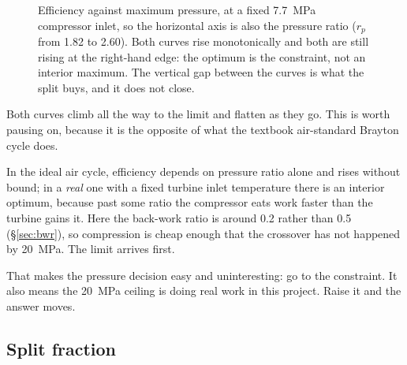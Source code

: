 \documentclass[11pt,a4paper]{report}
\begin{document}
\begin{figure}[htbp]
\centering
{}
\caption{Efficiency against maximum pressure, at a fixed
\SI{7.7}{\mega\pascal} compressor inlet, so the horizontal axis is also the
pressure ratio ($r_p$ from \num{1.82} to \num{2.60}). Both curves rise
monotonically and both are still rising at the right-hand edge: the optimum
is the constraint, not an interior maximum. The vertical gap between the
curves is what the split buys, and it does not close.}
\label{fig:eta_rp}
\end{figure}

Both curves climb all the way to the limit and flatten as they go. This is
worth pausing on, because it is the opposite of what the textbook
air-standard Brayton cycle does.

In the ideal air cycle, efficiency depends on pressure ratio alone and rises
without bound; in a \emph{real} one with a fixed turbine inlet temperature
there is an interior optimum, because past some ratio the compressor eats
work faster than the turbine gains it. Here the back-work ratio is around
\num{0.2} rather than \num{0.5} (\S\ref{sec:bwr}), so compression is cheap
enough that the crossover has not happened by \SI{20}{\mega\pascal}. The
limit arrives first.

That makes the pressure decision easy and uninteresting: go to the
constraint. It also means the \SI{20}{\mega\pascal} ceiling is doing real
work in this project. Raise it and the answer moves.

\subsection{Split fraction}
\end{document}
